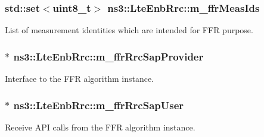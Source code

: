 \subsubsection[{\texorpdfstring{m\+\_\+ffr\+Meas\+Ids}{m_ffrMeasIds}}]{\setlength{\rightskip}{0pt plus 5cm}std\+::set$<$uint8\+\_\+t$>$ ns3\+::\+Lte\+Enb\+Rrc\+::m\+\_\+ffr\+Meas\+Ids\hspace{0.3cm}{\ttfamily [private]}}\hypertarget{classns3_1_1LteEnbRrc_a20814939a7e5b4152f041af937b4516d}{}\label{classns3_1_1LteEnbRrc_a20814939a7e5b4152f041af937b4516d}


List of measurement identities which are intended for F\+FR purpose. 

\subsubsection[{\texorpdfstring{m\+\_\+ffr\+Rrc\+Sap\+Provider}{m_ffrRrcSapProvider}}]{$\ast$ ns3\+::\+Lte\+Enb\+Rrc\+::m\+\_\+ffr\+Rrc\+Sap\+Provider\hspace{0.3cm}{\ttfamily [private]}}\hypertarget{classns3_1_1LteEnbRrc_a59b80550bb8f0690f1a2e2471cd402a9}{}\label{classns3_1_1LteEnbRrc_a59b80550bb8f0690f1a2e2471cd402a9}


Interface to the F\+FR algorithm instance. 

\subsubsection[{\texorpdfstring{m\+\_\+ffr\+Rrc\+Sap\+User}{m_ffrRrcSapUser}}]{$\ast$ ns3\+::\+Lte\+Enb\+Rrc\+::m\+\_\+ffr\+Rrc\+Sap\+User\hspace{0.3cm}{\ttfamily [private]}}\hypertarget{classns3_1_1LteEnbRrc_a27f4337867e3e886bc1caad3c010698f}{}\label{classns3_1_1LteEnbRrc_a27f4337867e3e886bc1caad3c010698f}


Receive A\+PI calls from the F\+FR algorithm instance. 


